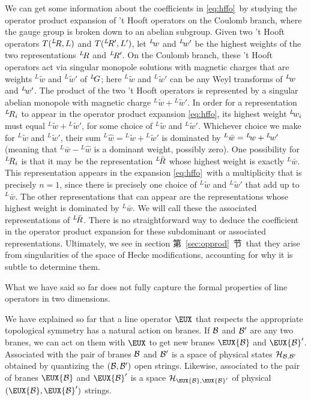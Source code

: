 We can get some information about the coefficients in \eqref{eq:hffo}\ by
studying the operator product expansion of 't Hooft operators on
the Coulomb branch, where the gauge group is broken down to an
abelian subgroup. Given two 't Hooft operators
$T({}^L\negthinspace R,L)$ and $T({}^L\negthinspace  R',L')$, let
$^L\negthinspace w$ and $^L\negthinspace w'$ be the highest
weights of the two representations $^L\negthinspace R $ and
$^L\negthinspace R'$.  On the Coulomb branch, these 't Hooft
operators act via singular monopole solutions with magnetic
charges that are weights $^L\tilde w$ and $^L\tilde w'$ of
$^L\negthinspace G$; here $^L\tilde w$ and $^L\tilde w'$ can be
any Weyl transforms of $^L\negthinspace w$ and $^L\negthinspace
w'$. The product of the two 't Hooft operators is represented by a
singular abelian monopole with magnetic charge $^L\tilde
w+{}^L\tilde w'$. In order for a representation $^L\negthinspace
R_i$ to appear in the operator product expansion \eqref{eq:hffo}, its
highest weight $^L\negthinspace w_i$ must equal $^L\tilde
w+{}^L\tilde w'$, for some choice of $^L\tilde w$ and ${}^L\tilde
w'$. Whichever choice we make for $^L\tilde w$ and $^L\tilde w'$,
their sum $^L\hat w={}^L\tilde w+{}^L\tilde w'$ is dominated by
$^L\bar w={}^L\negthinspace w+{}^L\negthinspace w'$ (meaning that
$^L\bar w -{}^L\hat w$ is a dominant weight, possibly zero). One
possibility for $^L\negthinspace R_i$ is that it may be the
representation $^L\negthinspace\bar R$ whose highest weight is
exactly $^L\bar w$.  This representation appears in the expansion
\eqref{eq:hffo}\ with a multiplicity that is precisely $n=1$, since there is
precisely one choice of $^L\tilde w$ and $^L\tilde w'$ that add up
to $^L\bar w$.  The other representations that can appear are the
representations whose highest weight  is dominated by $^L\bar w$.
We will call these the associated representations of
$^L\negthinspace\bar R$. There is no straightforward way to deduce
the coefficient in the operator product expansion for these
subdominant or associated representations. Ultimately, we see in
section 第~\ref{sec:opprod}~节\ that they arise from singularities of the space
of Hecke modifications, accounting for why it is subtle to
determine them.

\par{}

What we have said so far does not fully capture the formal
properties of line operators in two dimensions.

We have explained so far that a line operator $\EUX$ that respects
the appropriate topological symmetry has a natural action on
branes.  If ${\cal B}$ and ${\cal B}'$ are any two branes, we can
act on them with $\EUX$ to get new branes $\EUX{\cal B}$ and
$\EUX{\cal B}'$.  Associated with the pair of branes ${\cal B}$
and ${\cal B}'$ is a space of physical states ${\cal H}_{{\cal
B},{\cal B}'}$ obtained by quantizing the $({\cal B},{\cal B}')$
open strings.  Likewise, associated to the pair of branes
$\EUX{\cal B}$ and $\EUX{\cal B}'$ is a space ${\cal H}_{\EUX
{\cal B},\EUX{\cal B}'}$ of physical $(\EUX{\cal B},\EUX{\cal
B}')$ strings.

